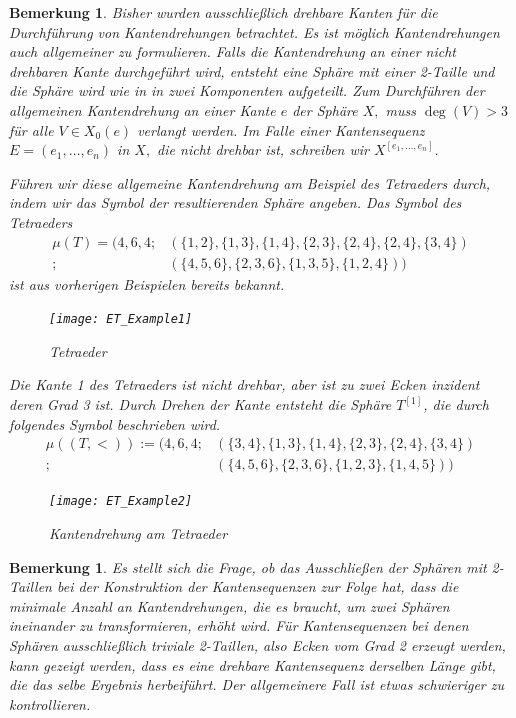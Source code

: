 \documentclass[12pt,titlepage,twoside,cleardoublepage]{article}
\theoremstyle{nummermitklammern}
\newtheorem{bemerkung}[temp]{Bemerkung}
\newtheorem{bemerkung}[zahl]{Bemerkung}
\numberwithin{equation}{section}
\begin{document}
\begin{bemerkung}
Bisher wurden ausschließlich drehbare Kanten für die Durchführung von Kantendrehungen betrachtet. Es ist möglich Kantendrehungen auch allgemeiner zu formulieren. Falls die Kantendrehung an einer nicht drehbaren Kante durchgeführt wird, entsteht eine Sphäre mit einer 2-Taille und die Sphäre wird wie in  in zwei Komponenten aufgeteilt.  Zum Durchführen der allgemeinen Kantendrehung an einer Kante $e$ der Sphäre $X,$ muss $\deg(V)>3$ für alle $V\in X_0(e)$ verlangt werden. Im Falle einer Kantensequenz $E=(e_1,\ldots,e_n)$ in $X,$ die nicht drehbar ist, schreiben wir $X^{[e_1,\ldots,e_n]}$.

 Führen wir diese allgemeine Kantendrehung am Beispiel des Tetraeders durch, indem wir das Symbol der resultierenden Sphäre angeben. Das Symbol des Tetraeders
\begin{align*}
\mu(T)=(4,6,4;&(\{1,2\}, \{1,3\},\{1,4\},\{2,3\},\{2,4\},\{2,4\},\{3,4\})\\
;&(\{4,5,6\},\{2,3,6\},\{1,3,5\},\{1,2,4\}))
\end{align*} ist aus vorherigen Beispielen bereits bekannt.
\begin{figure}[H]
\begin{center}
\texttt{[image: ET\_Example1]}
\end{center}
\caption{Tetraeder}
\end{figure}
Die Kante 1 des Tetraeders ist nicht drehbar, aber ist zu zwei Ecken inzident deren Grad 3 ist. Durch Drehen der Kante entsteht die Sphäre $T^{[1]}$, die durch folgendes Symbol beschrieben wird.
\begin{align*}
\mu ((T,<)):=(4,6,4;&(\{3,4\},\{1,3\},\{1,4\},\{2,3\},\{2,4\},\{3,4\})\\
;&(\{4,5,6\},\{2,3,6\},\{1,2,3\},\{1,4,5\}))
\end{align*}
\begin{figure}[H]
\begin{center}
\texttt{[image: ET\_Example2]}
\end{center}
\caption{Kantendrehung am Tetraeder}
\end{figure}

\end{bemerkung}

\begin{bemerkung}
Es stellt sich die Frage, ob das Ausschließen der Sphären mit 2-Taillen bei der Konstruktion der Kantensequenzen zur Folge hat, dass die minimale Anzahl an Kantendrehungen, die es braucht, um zwei Sphären ineinander zu transformieren, erhöht wird. Für Kantensequenzen bei denen Sphären ausschließlich triviale 2-Taillen, also Ecken vom Grad 2 erzeugt werden, kann gezeigt werden, dass es eine drehbare Kantensequenz derselben Länge gibt, die das selbe Ergebnis herbeiführt. Der allgemeinere Fall ist etwas schwieriger zu kontrollieren.
\end{bemerkung}
\end{document}
